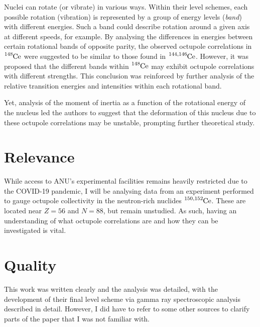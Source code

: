 \documentclass[12pt,a4paper]{article}
\begin{document}
\medskip
Nuclei can rotate (or vibrate) in various ways. Within their level schemes, each possible rotation (vibration) is represented by a group of energy levels (\textit{band}) with different energies. Such a band could describe rotation around a given axis at different speeds, for example. By analysing the differences in energies between certain rotational bands of opposite parity, the observed octupole correlations in $\ce{^{148}Ce}$ were suggested to be similar to those found in $\ce{^{144,146}Ce}$. However, it was proposed that the different bands within $\ce{^{148}Ce}$ may exhibit octupole correlations with different strengths. This conclusion was reinforced by further analysis of the relative transition energies and intensities within each rotational band. 

\medskip
Yet, analysis of the moment of inertia as a function of the rotational energy of the nucleus led the authors to suggest that the deformation of this nucleus due to these octupole correlations may be unstable, prompting further theoretical study. 

\section*{Relevance}
While access to ANU's experimental facilities remains heavily restricted due to the COVID-19 pandemic, I will be analysing data from an experiment performed to gauge octupole collectivity in the neutron-rich nuclides $\ce{^{150,152}Ce}$. These are located near $Z=56$ and $N=88$, but remain unstudied. As such, having an understanding of what octupole correlations are and how they can be investigated is vital.

\section*{Quality}
This work was written clearly and the analysis was detailed, with the development of their final level scheme via gamma ray spectroscopic analysis described in detail. 
However, I did have to refer to some other sources to clarify parts of the paper that I was not familiar with. 
\end{document}
